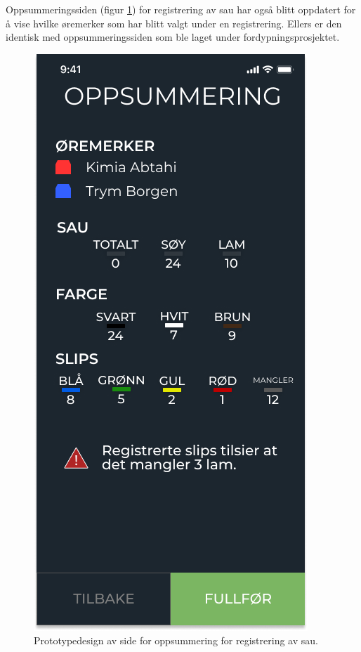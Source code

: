 \noindent
Oppsummeringssiden (figur \ref{fig:figma-sau-oppsummering}) for registrering av sau har også blitt oppdatert for å vise hvilke øremerker som har blitt valgt under en registrering. Ellers er den identisk med oppsummeringssiden som ble laget under fordypningsprosjektet.

\begin{figure}[H]
\centering
\captionsetup{width=.8\linewidth}
\includegraphics[scale=0.4]{Figurer/Figma/Frame 2.2.5 - Oppsummering.png}
\caption{Prototypedesign av side for oppsummering for registrering av sau.}
\label{fig:figma-sau-oppsummering}
\end{figure}

